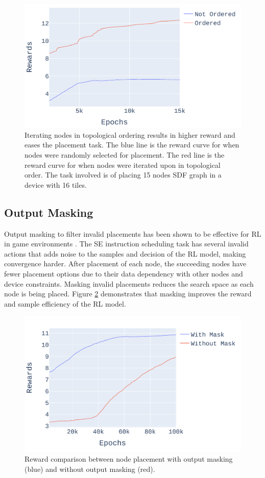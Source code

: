 \begin{figure}[h]
  \centering
  \includegraphics[width=\linewidth]{fig/plot_ordered.pdf}
  \caption{Iterating nodes in topological ordering results in higher reward and eases the placement task. 
 The blue line is the reward curve for when nodes were randomly selected for placement. The red line is the reward curve for when nodes were iterated upon in topological order. The task involved is of placing 15 nodes SDF graph in a device with 16 tiles.}
  \label{fig:ordered_placement}
\end{figure}


\subsection{Output Masking}
\label{subsec:output_masking}
Output masking to filter invalid placements has been shown to be effective for RL in game environments \cite{Shengyi_mask}. 
The SE instruction scheduling task has several invalid actions that adds noise to the samples and decision of the RL model, making convergence harder. 
After placement of each node, the succeeding nodes have fewer placement options due to their data dependency with other nodes and device constraints.
Masking invalid placements reduces the search space as each node is being placed. 
Figure \ref{fig:mask_nomask} demonstrates that masking improves the reward and sample efficiency of the RL model.

\begin{figure}[h]
  \centering
  \includegraphics[width=\linewidth]{fig/ifft_masked_nomask.pdf}
  \caption{Reward comparison between node placement with output masking (blue) and without output masking (red).}
  \label{fig:mask_nomask}
\end{figure}

